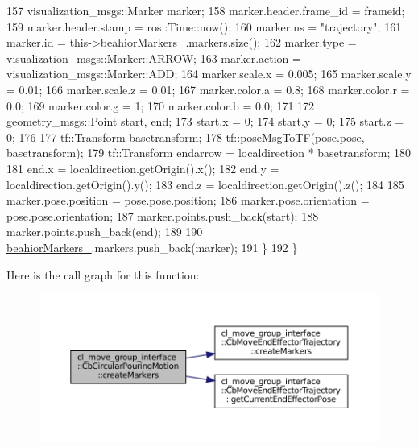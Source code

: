 \begin{DoxyCode}
157             visualization\_msgs::Marker marker;
158             marker.header.frame\_id = frameid;
159             marker.header.stamp = ros::Time::now();
160             marker.ns = \textcolor{stringliteral}{"trajectory"};
161             marker.id = this->\hyperlink{classcl__move__group__interface_1_1CbMoveEndEffectorTrajectory_a809fb5385adf27c0a1c8f8136566949c}{beahiorMarkers\_}.markers.size();
162             marker.type = visualization\_msgs::Marker::ARROW;
163             marker.action = visualization\_msgs::Marker::ADD;
164             marker.scale.x = 0.005;
165             marker.scale.y = 0.01;
166             marker.scale.z = 0.01;
167             marker.color.a = 0.8;
168             marker.color.r = 0.0;
169             marker.color.g = 1;
170             marker.color.b = 0.0;
171 
172             geometry\_msgs::Point start, end;
173             start.x = 0;
174             start.y = 0;
175             start.z = 0;
176 
177             tf::Transform basetransform;
178             tf::poseMsgToTF(pose.pose, basetransform);
179             tf::Transform endarrow = localdirection * basetransform;
180 
181             end.x = localdirection.getOrigin().x();
182             end.y = localdirection.getOrigin().y();
183             end.z = localdirection.getOrigin().z();
184 
185             marker.pose.position = pose.pose.position;
186             marker.pose.orientation = pose.pose.orientation;
187             marker.points.push\_back(start);
188             marker.points.push\_back(end);
189 
190             \hyperlink{classcl__move__group__interface_1_1CbMoveEndEffectorTrajectory_a809fb5385adf27c0a1c8f8136566949c}{beahiorMarkers\_}.markers.push\_back(marker);
191         \}
192     \}
\end{DoxyCode}
Here is the call graph for this function\+:
\nopagebreak
\begin{figure}[H]
\begin{center}
\leavevmode
\includegraphics[width=350pt]{classcl__move__group__interface_1_1CbCircularPouringMotion_a26d603b1d9bdbf5b71da6c1c4af2c322_cgraph}
\end{center}
\end{figure}
\mbox{\label{classcl__move__group__interface_1_1CbCircularPouringMotion_a9150bb3731082aad3af2d7d6e067a344}} 
